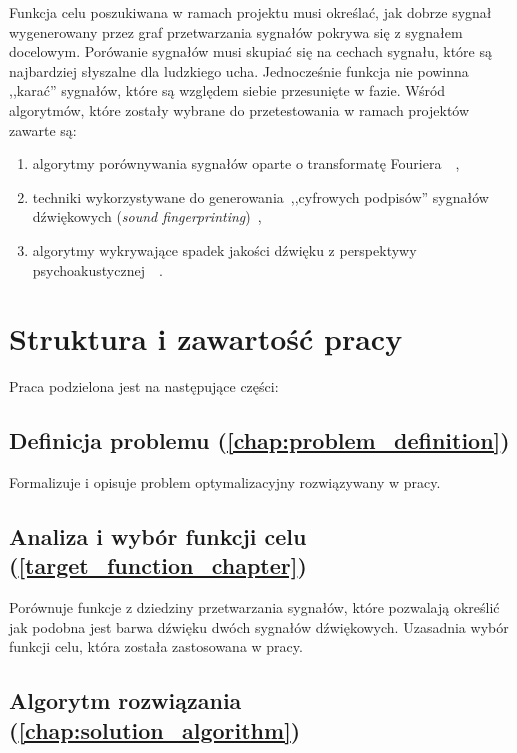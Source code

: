 Funkcja celu poszukiwana w ramach projektu musi określać, jak dobrze sygnał wygenerowany przez
graf przetwarzania sygnałów pokrywa się z sygnałem docelowym. Porówanie sygnałów musi skupiać się
na cechach sygnału, które są najbardziej słyszalne dla ludzkiego ucha. Jednocześnie funkcja nie powinna
,,karać'' sygnałów, które są względem siebie przesunięte w fazie. Wśród algorytmów, które zostały wybrane
do przetestowania w ramach projektów zawarte są:

\begin{enumerate}
  \item algorytmy porównywania sygnałów oparte o transformatę Fouriera~\cite{sliding_fourier}~\cite{mfcc},
  \item techniki wykorzystywane do generowania~,,cyfrowych podpisów'' sygnałów dźwiękowych (\textit{sound fingerprinting})~\cite{computer_vision_music_identification},
  \item algorytmy wykrywające spadek jakości dźwięku z perspektywy psychoakustycznej~\cite{peaq}~\cite{frechet_audio_distance}.
\end{enumerate}

\section{Struktura i zawartość pracy}

Praca podzielona jest na następujące części:

\subsection*{Definicja problemu (\ref{chap:problem_definition})}

Formalizuje i opisuje problem optymalizacyjny rozwiązywany w pracy.

\subsection*{Analiza i wybór funkcji celu (\ref{target_function_chapter}) }

Porównuje funkcje z dziedziny przetwarzania sygnałów, które pozwalają określić jak podobna jest barwa dźwięku dwóch sygnałów dźwiękowych.
Uzasadnia wybór funkcji celu, która została zastosowana w pracy.

\subsection*{Algorytm rozwiązania (\ref{chap:solution_algorithm})}

